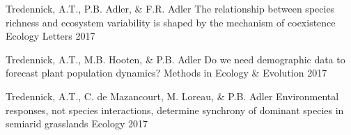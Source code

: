 

\begin{cventries}

  \eduentry
    {Tredennick, A.T., P.B. Adler, \& F.R. Adler} %
    {The relationship between species richness and ecosystem variability is shaped by the mechanism of coexistence} %
    {Ecology Letters} %
    {2017} %

  \eduentry
    {Tredennick, A.T., M.B. Hooten, \& P.B. Adler} %
    {Do we need demographic data to forecast plant population dynamics?} %
    {Methods in Ecology \& Evolution} %
    {2017} %

  \eduentry
    {Tredennick, A.T., C. de Mazancourt, M. Loreau, \& P.B. Adler} %
    {Environmental responses, not species interactions, determine synchrony of dominant species in semiarid grasslands} %
    {Ecology} %
    {2017} %

\end{cventries}
